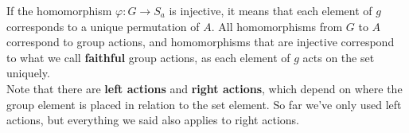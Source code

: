 \documentclass[12pt]{article}
\begin{document}
    If the homomorphism $\varphi: G \to S_a$ is injective,
    it means that each element of $g$ corresponds
    to a unique permutation of $A$.
    All homomorphisms from $G$ to $A$ correspond to group actions,
    and homomorphisms that are injective
    correspond to what we call \textbf{faithful} group actions,
    as each element of $g$ acts on the set uniquely. \\ 

    Note that there are \textbf{left actions} and \textbf{right actions},
    which depend on where the group element is placed
    in relation to the set element.
    So far we've only used left actions,
    but everything we said also applies to right actions. \\
\end{document}
